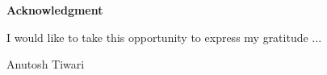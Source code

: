 \newpage
\thispagestyle{empty}
\cleardoublepage

\newpage
\thispagestyle{plain}
\begin{center}
\textbf{\Large Acknowledgment}
\end{center}

	\vspace*{-6mm}
	I would like to take this opportunity to express my gratitude ...


\vspace*{2mm}
\begin{flushright}
	Anutosh Tiwari
\end{flushright}




\newpage
\thispagestyle{empty}
\cleardoublepage
